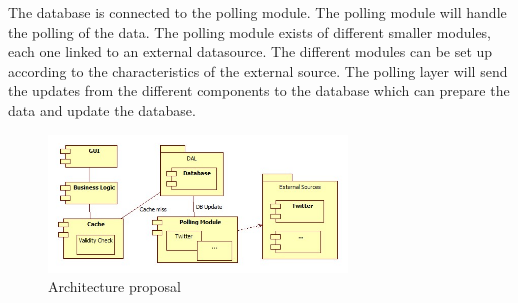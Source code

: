 \documentclass{article}
\begin{document}
The database is connected to the polling module. The polling module will handle the polling of the data. The polling module exists of different smaller modules, each one linked to an external datasource. The different modules can be set up according to the characteristics of the external source. The polling layer will send the updates from the different components to the database which can prepare the data and update the database.

\begin{figure}[!]
\centering
\includegraphics[width=300px]{ProposedSolution}
\caption{Architecture proposal}
\label{fig:fig6}
\end{figure}


\newpage

\nocite{*}


\end{document}
